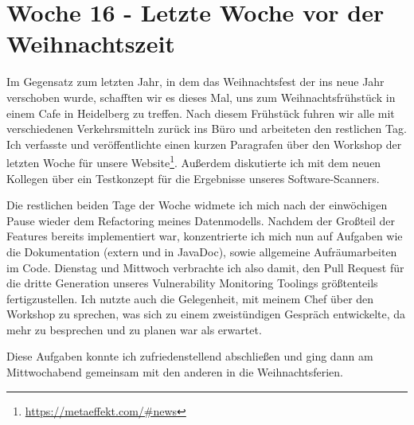 \section{Woche 16 - Letzte Woche vor der Weihnachtszeit} \label{sec:bericht-wo-16-initial}


\lweekdaymarginpar{\weekdayMondayLong}

Im Gegensatz zum letzten Jahr, in dem das Weihnachtsfest der {\metaeffekt} ins neue Jahr verschoben wurde, schafften wir es dieses Mal, uns zum Weihnachtsfrühstück in einem Cafe in Heidelberg zu treffen.
Nach diesem Frühstück fuhren wir alle mit verschiedenen Verkehrsmitteln zurück ins Büro und arbeiteten den restlichen Tag.
Ich verfasste und veröffentlichte einen kurzen Paragrafen über den Workshop der letzten Woche für unsere Website\footnote{\url{https://metaeffekt.com/\#news}}.
Außerdem diskutierte ich mit dem neuen Kollegen über ein Testkonzept für die Ergebnisse unseres Software-Scanners.

\sweekdaymarginpar{\weekdayTuesdayShort, \weekdayWednesdayShort}

Die restlichen beiden Tage der Woche widmete ich mich nach der einwöchigen Pause wieder dem Refactoring meines Datenmodells.
Nachdem der Großteil der Features bereits implementiert war, konzentrierte ich mich nun auf Aufgaben wie die Dokumentation (extern und in JavaDoc), sowie allgemeine Aufräumarbeiten im Code.
Dienstag und Mittwoch verbrachte ich also damit, den Pull Request für die dritte Generation unseres Vulnerability Monitoring Toolings größtenteils fertigzustellen.
Ich nutzte auch die Gelegenheit, mit meinem Chef über den Workshop zu sprechen, was sich zu einem zweistündigen Gespräch entwickelte, da mehr zu besprechen und zu planen war als erwartet.

Diese Aufgaben konnte ich zufriedenstellend abschließen und ging dann am Mittwochabend gemeinsam mit den anderen in die Weihnachtsferien.
